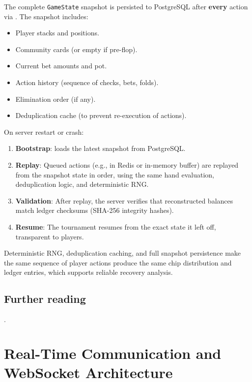\documentclass[11pt,a4paper]{article}
\begin{document}
The complete \texttt{GameState} snapshot is persisted to PostgreSQL after \textbf{every} action via . The snapshot includes:

\begin{itemize}
\item Player stacks and positions.
\item Community cards (or empty if pre-flop).
\item Current bet amounts and pot.
\item Action history (sequence of checks, bets, folds).
\item Elimination order (if any).
\item Deduplication cache (to prevent re-execution of actions).
\end{itemize}

On server restart or crash:

\begin{enumerate}
\item \textbf{Bootstrap}:  loads the latest snapshot from PostgreSQL.
\item \textbf{Replay}: Queued actions (e.g., in Redis or in-memory buffer) are replayed from the snapshot state in order, using the same hand evaluation, deduplication logic, and deterministic RNG.
\item \textbf{Validation}: After replay, the server verifies that reconstructed balances match ledger checksums (SHA-256 integrity hashes).
\item \textbf{Resume}: The tournament resumes from the exact state it left off, transparent to players.
\end{enumerate}

Deterministic RNG, deduplication caching, and full snapshot persistence make the same sequence of player actions produce the same chip distribution and ledger entries, which supports reliable recovery analysis.

\subsection{Further reading}

.

\section{Real-Time Communication and WebSocket Architecture}
\label{app:realtime}
\end{document}
